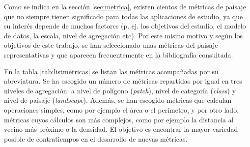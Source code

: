 Como se indica en la sección \ref{sec:metrica}, existen cientos de métricas de paisaje que no siempre tienen significado para todas las aplicaciones de estudio, ya que su interés depende de muchos factores (p. ej. los objetivos del estudio, el modelo de datos, la escala, nivel de agregación etc). Por este mismo motivo y según los objetivos de este trabajo, se han seleccionado unas métricas del paisaje representativas y que aparecen frecuentemente en la bibliografía consultada.

En la tabla \ref{tab:listmetricas} se listan las métricas acompañadas por su abreviatura. Se ha escogido un número de métricas repartidas por igual en tres niveles de agregación: a nivel de polígono (\textit{patch}), nivel de categoría (\textit{class}) y nivel de paisaje (\textit{landscape}). Además, se han escogido métricas que calculan operaciones simples, como por ejemplo el área o el perímetro, y por otro lado, métricas cuyos cálculos son más complejos, como por ejemplo la distancia al vecino más próximo o la densidad. El objetivo es encontrar la mayor variedad posible de contratiempos en el desarrollo de nuevas métricas.

